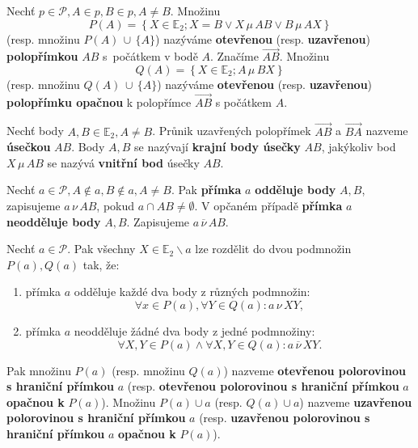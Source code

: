 \begin{definition}
  Nechť $p\in \mathscr P,A \in p, B \in p, A \ne B.$ Množinu
  \[
    P(A)=\left \{ X\in \mathbb E_2; X=B \lor X\,\mu\, AB \lor B\, \mu\, AX \right \}
  \]
  (resp. množinu $P(A)\,\cup\, \{A\}$) nazýváme \textbf{otevřenou} (resp. \textbf{uzavřenou}) \textbf{polopřímkou} $AB$ s~počátkem v bodě $A$. Značíme $\overrightarrow{AB}$. Množinu
  \[
    Q(A)=\left \{ X\in \mathbb E_2; A\,\mu\, BX \right \}
  \]
  (resp. množinu $Q(A)\,\cup\, \{A\}$) nazýváme \textbf{otevřenou} (resp. \textbf{uzavřenou}) \textbf{polopřímku opačnou} k polopřímce $\overrightarrow{AB}$ s počátkem $A$.
\end{definition}

\begin{definition}
  Nechť body $A,B\in \mathbb E_2, A\ne B$. Průnik uzavřených polopřímek $\overrightarrow{AB}$ a $\overrightarrow{BA}$ nazveme \textbf{úsečkou} $AB$.
  Body $A,B$ se nazývají \textbf{krajní body úsečky} $AB$, jakýkoliv bod $X\,\mu \, AB$ se nazývá \textbf{vnitřní bod} úsečky $AB$.
\end{definition}

\begin{definition}
Nechť $a\in \mathscr P, A\notin a, B\notin a, A\ne B.$ Pak \textbf{přímka} $a$ \textbf{odděluje body} $A,B$, zapisujeme $a\, \nu\, AB$, pokud $a \cap AB \neq \emptyset$. V opčaném případě \textbf{přímka} $a$ \textbf{neodděluje body} $A,B$. Zapisujeme $a\, \overline \nu \,AB.$
\end{definition}

\begin{definition}
  Nechť $a \in \mathscr P$. Pak všechny $X\in \mathbb E_2 \smallsetminus a$ lze rozdělit do dvou podmnožin $P(a), Q(a)$ tak, že:
  \begin{enumerate}[$i.$]
    \item přímka $a$ odděluje každé dva body z různých podmnožin:
      \[
        \forall x \in P(a), \forall Y \in Q(a): a \, \nu \, XY,
      \]
    \item přímka $a$ neodděluje žádné dva body z jedné podmnožiny:
      \[
        \forall X, Y \in P(a) \land \forall X,Y \in Q(a): a \,\overline \nu\, XY.
      \]
  \end{enumerate}
  Pak množinu $P(a)$ (resp. množinu $Q(a)$) nazveme \textbf{otevřenou polorovinou s hraniční přímkou} $a$ (resp. \textbf{otevřenou polorovinou s hraniční přímkou} $a$ \textbf{opačnou k} $P(a)$). Množinu $P(a)\cup a$ (resp. $Q(a) \cup a$) nazveme \textbf{uzavřenou polorovinou s hraniční přímkou} $a$ (resp. \textbf{uzavřenou polorovinou s hraniční přímkou} $a$ \textbf{opačnou k} $P(a)$).
\end{definition}

